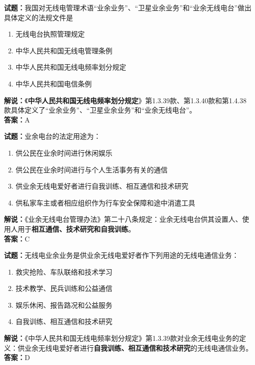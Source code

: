 \documentclass{ctexbook}
\begin{document}
\bigskip


\noindent\textbf{试题：}我国对无线电管理术语“业余业务”、“卫星业余业务”和“业余无线电台”做出具体定义的法规文件是
\begin{enumerate}[leftmargin=3em]
\item 无线电台执照管理规定
\item 中华人民共和国无线电管理条例
\item 中华人民共和国无线电频率划分规定
\item 中华人民共和国电信条例
\end{enumerate}
\textbf{解说：}《\textbf{中华人民共和国无线电频率划分规定}》第1.3.39款、第1.3.40款和第1.4.38款具体定义了“业余业务”、“卫星业余业务”和“业余无线电台”。\\\noindent\textbf{答案：}A

\bigskip


\noindent\textbf{试题：}业余电台的法定用途为：
\begin{enumerate}[leftmargin=3em]
\item 供公民在业余时间进行休闲娱乐
\item 供公民在业余时间进行与个人生活事务有关的通信
\item 供业余无线电爱好者进行自我训练、相互通信和技术研究
\item 供私家车主或者相应组织作为行车安全保障和途中消遣工具
\end{enumerate}
\noindent\textbf{解说：}《业余无线电台管理办法》第二十八条规定：业余无线电台供其设置人、使用人用于\textbf{相互通信、技术研究和自我训练}。\\\noindent\textbf{答案：}C

\bigskip


\noindent\textbf{试题：}无线电业余业务是供业余无线电爱好者作下列用途的无线电通信业务：
\begin{enumerate}[leftmargin=3em]
\item 救灾抢险、车队联络和技术学习
\item 技术教学、民兵训练和公益通信
\item 娱乐休闲、报告路况和公益服务
\item 自我训练、相互通信和技术研究
\end{enumerate}
\noindent\textbf{解说：}《中华人民共和国无线电频率划分规定》第1.3.39款对业余无线电业务的定义：供业余无线电爱好者进行\textbf{自我训练、相互通信和技术研究}的无线电通信业务。\\\noindent\textbf{答案：}D

\bigskip
\end{document}

